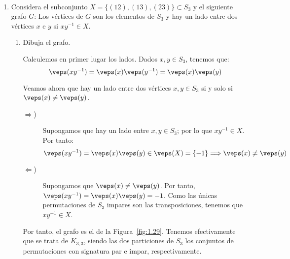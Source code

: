 \begin{ejercicio}\label{ej:1.29}~
    \begin{enumerate}
        \item Considera el subconjunto $X = \{(12),(13),(23)\} \subset S_3$ y el siguiente grafo $G$: Los vértices de $G$ son los elementos de $S_3$ y hay un lado entre dos vértices $x$ e $y$ si $xy^{-1} \in X$.
        \begin{enumerate}
            \item Dibuja el grafo.
            
            Calculemos en primer lugar los lados. Dados $x,y\in S_3$, tenemos que:
            \begin{equation*}
                \veps(xy^{-1}) = \veps(x)\veps(y^{-1}) = \veps(x)\veps(y)
            \end{equation*}

            Veamos ahora que hay un lado entre dos vértices $x,y\in S_3$ si y solo si $\veps(x)\neq\veps(y)$.
            \begin{description}
                \item[$\Rightarrow$)] Supongamos que hay un lado entre $x,y\in S_3$; por lo que $xy^{-1}\in X$. Por tanto:
                \begin{equation*}
                    \veps(xy^{-1}) = \veps(x)\veps(y)\in \veps(X)=\{-1\}
                    \Longrightarrow
                    \veps(x)\neq\veps(y)
                \end{equation*}

                \item[$\Leftarrow$)] Supongamos que $\veps(x)\neq\veps(y)$. Por tanto, $\veps(xy^{-1})=\veps(x)\veps(y)=-1$. Como las únicas permutaciones de $S_3$ impares son las transposiciones, tenemos que $xy^{-1}\in X$.
            \end{description}

            Por tanto, el grafo es el de la Figura~\ref{fig:1.29}. Tenemos efectivamente que se trata de $K_{3,3}$, siendo las dos particiones de $S_3$ los conjuntos de permutaciones con signatura par e impar, respectivamente.
            \begin{figure}
                \centering
\end{figure}
\end{enumerate}
\end{enumerate}
\end{ejercicio}
